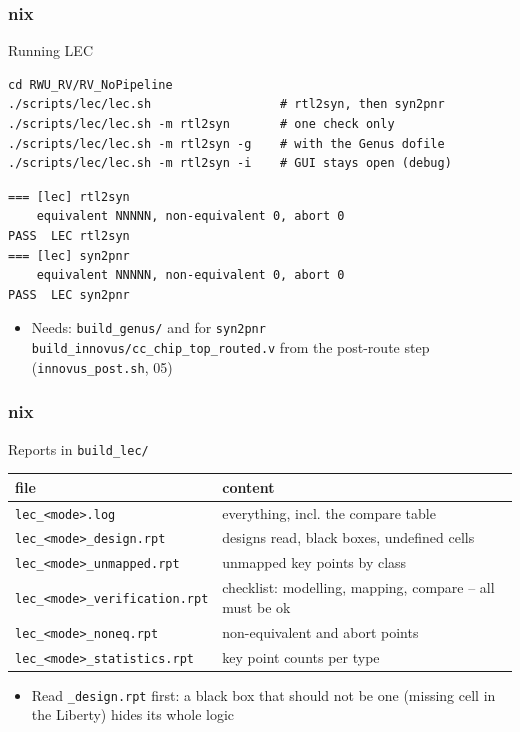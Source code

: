 \documentclass{beamer}
\newcommand{\astitle}{nix}
\newcommand{\assubtitle}{nix}
\newcommand{\cmd}[1]{\texttt{#1}}
\begin{document}
\renewcommand{\assubtitle}{Running LEC}
\begin{frame}[fragile]
\frametitle{\astitle}
\begin{block}{\assubtitle}
\begin{lstlisting}[style=sh]
cd RWU_RV/RV_NoPipeline
./scripts/lec/lec.sh                  # rtl2syn, then syn2pnr
./scripts/lec/lec.sh -m rtl2syn       # one check only
./scripts/lec/lec.sh -m rtl2syn -g    # with the Genus dofile
./scripts/lec/lec.sh -m rtl2syn -i    # GUI stays open (debug)
\end{lstlisting}
\begin{lstlisting}[style=out]
=== [lec] rtl2syn
    equivalent NNNNN, non-equivalent 0, abort 0
PASS  LEC rtl2syn
=== [lec] syn2pnr
    equivalent NNNNN, non-equivalent 0, abort 0
PASS  LEC syn2pnr
\end{lstlisting}
  \begin{itemize}
    \item Needs: \cmd{build\_genus/} and for \cmd{syn2pnr}
      \cmd{build\_innovus/cc\_chip\_top\_routed.v} from the post-route
      step (\cmd{innovus\_post.sh}, 05)
  \end{itemize}
\end{block}
\end{frame}

\renewcommand{\assubtitle}{Reports in \texttt{build\_lec/}}
\begin{frame}
\frametitle{\astitle}
\begin{block}{\assubtitle}
  \footnotesize
  \begin{tabularx}{\linewidth}{@{}lY@{}}
    \textbf{file} & \textbf{content}\\\hline
    \cmd{lec\_<mode>.log}              & everything, incl. the compare table\\
    \cmd{lec\_<mode>\_design.rpt}      & designs read, black boxes,
                                         undefined cells\\
    \cmd{lec\_<mode>\_unmapped.rpt}    & unmapped key points by class\\
    \cmd{lec\_<mode>\_verification.rpt} & checklist: modelling, mapping,
                                         compare -- all must be ok\\
    \cmd{lec\_<mode>\_noneq.rpt}       & non-equivalent and abort points\\
    \cmd{lec\_<mode>\_statistics.rpt}  & key point counts per type\\
  \end{tabularx}
  \vspace{4pt}
  \begin{itemize}
    \item Read \cmd{\_design.rpt} first: a black box that should not be
      one (missing cell in the Liberty) hides its whole logic
  \end{itemize}
\end{block}
\end{frame}
\end{document}
